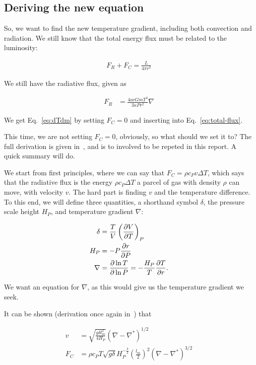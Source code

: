 \documentclass[11pt,twocolumn]{article}
\begin{document}
\subsection{Deriving the new equation}

So, we want to find the new temperature gradient, including both convection and radiation. We still know that the total energy flux must be related to the luminosity:

\begin{align}
    F_R + F_C = \frac{L}{4\pi r^2}\label{eq:total-flux}
\end{align}

We still have the radiative flux, given as

\begin{align}
    F_R &= \frac{4acGmT^4}{3\kappa P r^2}\nabla \label{eq:radiative-flux}
\end{align}

We get Eq.~\eqref{eq:dTdm} by setting $F_C = 0$ and inserting into Eq.~\eqref{eq:total-flux}.

This time, we are not setting $F_C = 0$, obviously, so what should we set it to? The full derivation is given in~\cite{lecture-notes}, and is to involved to be repeted in this report. A quick summary will do.

We start from first principles, where we can say that $F_C = \rho c_P v \Delta T$, which says that the radiative flux is the energy $\rho c_P \Delta T$ a parcel of gas with density $\rho$ can move, with velocity $v$. The hard part is finding $v$ and the temperature difference. To this end, we will define three quantities, a shorthand symbol $\delta$, the pressure scale height $H_P$, and temperature gradient $\nabla $:

\begin{align}
    \delta &= \frac{T}{V}\left( \frac{\partial V}{\partial T} \right)_P\label{eq:delta-def}\\
    H_P &= -P\frac{\partial r}{\partial P}\label{eq:Hp-def}\\
    \nabla &= \frac{\partial \ln T}{\partial \ln P} = -\frac{H_P}{T}\frac{\partial T}{\partial r}\label{eq:grad-def}.
\end{align}

We want an equation for $\nabla$, as this would give us the temperature gradient we seek.

It can be shown (derivation once again in~\cite{lecture-notes}) that

\begin{align}
    v &= \sqrt{\frac{g\delta l_m^2}{4H_P}}(\nabla - \nabla^*)^{1/2}\label{eq:v}\\
    F_C &= \rho c_P T\sqrt{g\delta}H_P^{-\frac{3}{2}}\left(\frac{l_m}{2}\right)^2 (\nabla - \nabla^*)^{3/2}\label{eq:Fc-expression}
\end{align}
\end{document}
